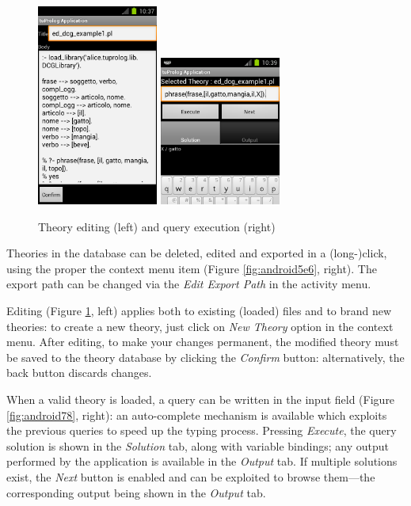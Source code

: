 \begin{figure}
\centering
  \includegraphics[width=150px]{images/android7.png}
  \includegraphics[width=150px]{images/android8.png}
  \caption{Theory editing (left) and query execution (right)}\label{fig:android7e8}
\end{figure}

Theories in the database can be deleted, edited and exported in a (long-)click, using the proper the context menu item (Figure \ref{fig:android5e6}, right). The export path can be changed via the \textit{Edit Export Path} in the activity menu.

Editing (Figure \ref{fig:android7e8}, left) applies both to existing (loaded) files and to brand new theories: to create a new theory, just click on \textit{New Theory} option in the context menu.
%
After editing, to make your changes permanent, the modified theory must be saved to the theory database by clicking the \textit{Confirm} button: alternatively, the back button discards changes.

When a valid theory is loaded, a query can be written in the input field (Figure \ref{fig:android78}, right): an auto-complete mechanism is available which exploits the previous queries to speed up the typing process.
%
Pressing \textit{Execute}, the query solution is shown in the \textit{Solution} tab, along with variable bindings; any output performed by the application is available in the \textit{Output} tab. If multiple solutions exist, the \textit{Next} button is enabled and can be exploited to browse them---the corresponding output being shown in the \textit{Output} tab.

